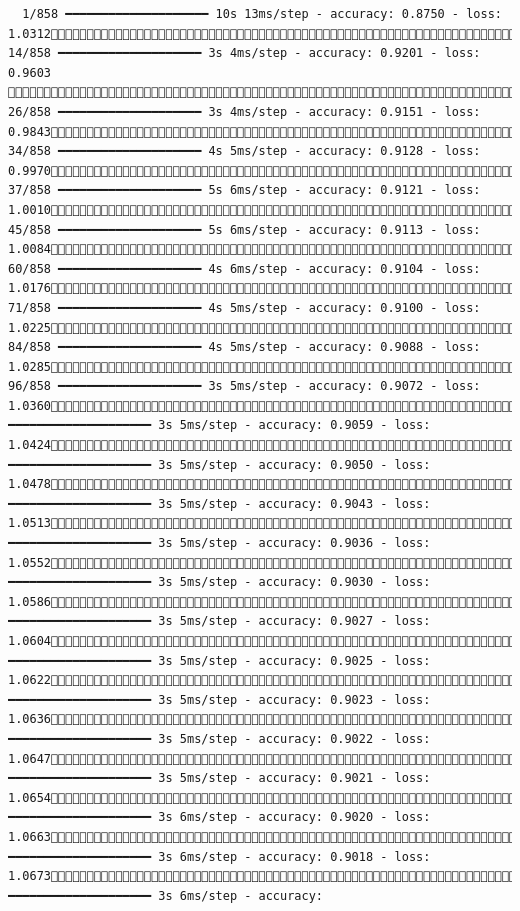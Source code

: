 \documentclass[
  letterpaper,
  DIV=11,
  numbers=noendperiod]{scrartcl}
\begin{document}
\begin{verbatim}
  1/858 ━━━━━━━━━━━━━━━━━━━━ 10s 13ms/step - accuracy: 0.8750 - loss: 1.0312 14/858 ━━━━━━━━━━━━━━━━━━━━ 3s 4ms/step - accuracy: 0.9201 - loss: 0.9603   26/858 ━━━━━━━━━━━━━━━━━━━━ 3s 4ms/step - accuracy: 0.9151 - loss: 0.9843 34/858 ━━━━━━━━━━━━━━━━━━━━ 4s 5ms/step - accuracy: 0.9128 - loss: 0.9970 37/858 ━━━━━━━━━━━━━━━━━━━━ 5s 6ms/step - accuracy: 0.9121 - loss: 1.0010 45/858 ━━━━━━━━━━━━━━━━━━━━ 5s 6ms/step - accuracy: 0.9113 - loss: 1.0084 60/858 ━━━━━━━━━━━━━━━━━━━━ 4s 6ms/step - accuracy: 0.9104 - loss: 1.0176 71/858 ━━━━━━━━━━━━━━━━━━━━ 4s 5ms/step - accuracy: 0.9100 - loss: 1.0225 84/858 ━━━━━━━━━━━━━━━━━━━━ 4s 5ms/step - accuracy: 0.9088 - loss: 1.0285 96/858 ━━━━━━━━━━━━━━━━━━━━ 3s 5ms/step - accuracy: 0.9072 - loss: 1.0360107/858 ━━━━━━━━━━━━━━━━━━━━ 3s 5ms/step - accuracy: 0.9059 - loss: 1.0424119/858 ━━━━━━━━━━━━━━━━━━━━ 3s 5ms/step - accuracy: 0.9050 - loss: 1.0478127/858 ━━━━━━━━━━━━━━━━━━━━ 3s 5ms/step - accuracy: 0.9043 - loss: 1.0513137/858 ━━━━━━━━━━━━━━━━━━━━ 3s 5ms/step - accuracy: 0.9036 - loss: 1.0552148/858 ━━━━━━━━━━━━━━━━━━━━ 3s 5ms/step - accuracy: 0.9030 - loss: 1.0586156/858 ━━━━━━━━━━━━━━━━━━━━ 3s 5ms/step - accuracy: 0.9027 - loss: 1.0604165/858 ━━━━━━━━━━━━━━━━━━━━ 3s 5ms/step - accuracy: 0.9025 - loss: 1.0622174/858 ━━━━━━━━━━━━━━━━━━━━ 3s 5ms/step - accuracy: 0.9023 - loss: 1.0636182/858 ━━━━━━━━━━━━━━━━━━━━ 3s 5ms/step - accuracy: 0.9022 - loss: 1.0647188/858 ━━━━━━━━━━━━━━━━━━━━ 3s 5ms/step - accuracy: 0.9021 - loss: 1.0654195/858 ━━━━━━━━━━━━━━━━━━━━ 3s 6ms/step - accuracy: 0.9020 - loss: 1.0663204/858 ━━━━━━━━━━━━━━━━━━━━ 3s 6ms/step - accuracy: 0.9018 - loss: 1.0673213/858 ━━━━━━━━━━━━━━━━━━━━ 3s 6ms/step - accuracy: 
\end{verbatim}
\end{document}
